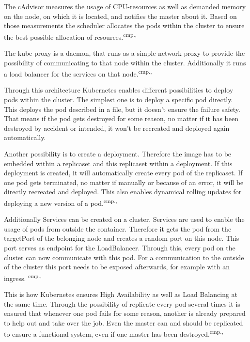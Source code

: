 The cAdvisor measures the usage of CPU-resources as well as demanded memory on the node, on which it is located, and notifies the master about it. Based on those measurements the scheduler allocates the pods within the cluster to ensure the best possible allocation of resources.\textsuperscript{cmp.\cite{19}, \cite{22}}

The kube-proxy is a daemon, that runs as a simple network proxy to provide the possibility of communicating to that node within the cluster. Additionally it runs a load balancer for the services on that node.\textsuperscript{cmp.\cite{19}, \cite{22}}

Through this architecture Kubernetes enables different possibilities to deploy pods within the cluster. The simplest one is to deploy a specific pod directly. This deploys the pod described in a file, but it doesn't ensure the failure safety. That means if the pod gets destroyed for some reason, no matter if it has been destroyed by accident or intended, it won't be recreated and deployed again automatically. 

Another possibility is to create a deployment. Therefore the image has to be embedded within a replicaset and this replicaset within a deployment. If this deployment is created, it will automatically create every pod of the replicaset. If one pod gets terminated, no matter if manually or because of an error, it will be directly recreated and deployed. This also enables dynamical rolling updates for deploying a new version of a pod.\textsuperscript{cmp.\cite{19}, \cite{23}}

Additionally Services can be created on a cluster. Services are used to enable the usage of pods from outside the container. Therefore it gets the pod from the targetPort of the belonging node and creates a random port on this node. This port serves as endpoint for the LoadBalancer. Through this, every pod on the cluster can now communicate with this pod. For a communication to the outside of the cluster this port needs to be exposed afterwards, for example with an ingress. \textsuperscript{cmp.\cite{19}, \cite{23}}

This is how Kubernetes ensures High Availability as well as Load Balancing at the same time. Through the possibility of replicate every pod several times it is ensured that whenever one pod fails for some reason, another is already prepared to help out and take over the job. Even the master can and should be replicated to ensure a functional system, even if one master has been destroyed.\textsuperscript{cmp.\cite{19}, \cite{23}}

